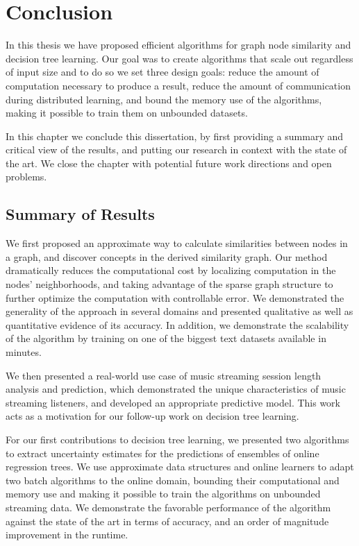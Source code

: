 \chapter{Conclusion}

In this thesis we have proposed efficient algorithms for graph node
similarity and decision tree learning. Our goal was to create
algorithms that scale out regardless of input size and to do so
we set three design goals: reduce the amount of computation
necessary to produce a result, reduce the amount of communication
during distributed learning, and bound the memory use of the algorithms,
making it possible to train them on unbounded datasets.

In this chapter we conclude this dissertation, by first providing a
summary and critical view of the results, and putting our research
in context with the state of the art.
We close the chapter with potential future work directions and open
problems.

\section{Summary of Results}
We first proposed an approximate way to calculate similarities between
nodes in a graph, and discover concepts in the derived similarity
graph. Our method dramatically reduces the computational cost
by localizing computation in the nodes' neighborhoods, and taking advantage
of the sparse graph structure to further optimize the computation with controllable
error. We demonstrated the generality of the approach in several domains and presented
qualitative as well as quantitative evidence of its accuracy. In addition, we demonstrate
the scalability of the algorithm by training on one of the biggest text datasets
available in minutes.

We then presented a real-world use case of music streaming session length analysis and prediction,
which demonstrated the unique characteristics of music streaming listeners, and developed
an appropriate predictive model. This work acts as a motivation for our follow-up work
on decision tree learning.

For our first contributions to decision tree learning,
we presented two algorithms to extract uncertainty estimates
for the predictions of ensembles of online regression trees.
We use approximate data structures and online learners to
adapt two batch algorithms to the online domain, bounding
their computational and memory use and making it possible
to train the algorithms on unbounded streaming data. We demonstrate the
favorable performance of the algorithm against the state of
the art in terms of accuracy, and an order of magnitude improvement
in the runtime.

